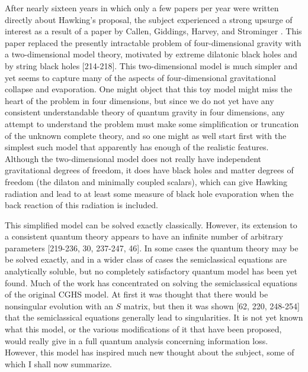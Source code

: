      After nearly sixteen years in which only a few papers per year
were
written directly about Hawking's proposal, the subject experienced a
strong
upsurge of interest as a result of a paper by Callen, Giddings,
Harvey, and
Strominger \cite{CGHS}.  This paper replaced the presently
intractable problem
of four-dimensional gravity with a two-dimensional model theory,
motivated by
extreme dilatonic black holes \cite{Gib88,GHS} and by string black
holes
[214-218].  This two-dimensional model is much simpler
and yet seems to capture many of the aspects of four-dimensional
gravitational
collapse and evaporation.  One might object that this toy model might
miss the heart of the problem in four dimensions, but since we do not
yet have
any consistent understandable theory of quantum gravity in four
dimensions, any
attempt to understand the problem must make some simplification or
truncation
of the unknown complete theory, and so one might as well start first
with the
simplest such model that apparently has enough of the realistic
features.
Although the two-dimensional model  does not really have independent
gravitational degrees of freedom, it does have black holes and matter
degrees
of freedom (the dilaton and minimally coupled scalars), which can
give Hawking
radiation and lead to at least some measure of black hole evaporation
when the
back reaction of this radiation is included.

     This simplified model can be solved exactly classically.
However, its
extension to a consistent quantum theory appears to have an infinite
number of arbitrary parameters
[219-236, 30, 237-247, 46].
In some cases the quantum theory
may be be solved exactly, and in a wider class of cases the
semiclassical
equations are analytically soluble, but no completely satisfactory
quantum
model has been yet found.  Much of the work has concentrated on
solving
the semiclassical equations of the original CGHS \cite{CGHS} model.
At first it was thought \cite{CGHS} that there would be nonsingular
evolution with an $S$ matrix, but then it was shown
[62, 220, 248-254]
that the semiclassical equations generally lead to singularities.
It is not yet known what this
model, or the various modifications of it that have been proposed,
would really
give in a full quantum analysis concerning information loss.
However, this
model has inspired much new thought about the subject, some of which
I shall
now summarize.

